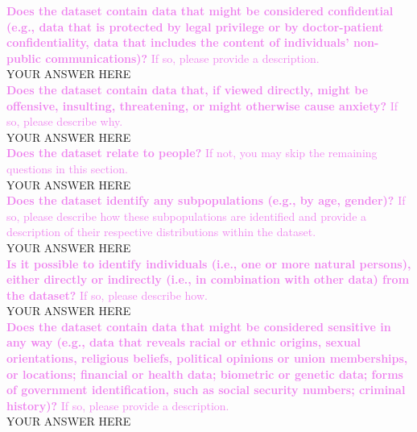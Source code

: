\documentclass[letterpaper, 10 pt, conference]{ieeeconf}
\newcommand{\sectioncolor}{violet}
\begin{document}
    \textcolor{\sectioncolor}{\textbf{
    Does the dataset contain data that might be considered confidential (e.g.,
    data that is protected by legal privilege or by doctor-patient
    confidentiality, data that includes the content of individuals’ non-public
    communications)?
    }
    If so, please provide a description.
    } \\
    YOUR ANSWER HERE \\
    
    \textcolor{\sectioncolor}{\textbf{
    Does the dataset contain data that, if viewed directly, might be offensive,
    insulting, threatening, or might otherwise cause anxiety?
    }
    If so, please describe why.
    } \\
    YOUR ANSWER HERE \\
    
    \textcolor{\sectioncolor}{\textbf{
    Does the dataset relate to people?
    }
    If not, you may skip the remaining questions in this section.
    } \\
    YOUR ANSWER HERE \\
    
    \textcolor{\sectioncolor}{\textbf{
    Does the dataset identify any subpopulations (e.g., by age, gender)?
    }
    If so, please describe how these subpopulations are identified and
    provide a description of their respective distributions within the dataset.
    } \\
    YOUR ANSWER HERE \\
    
    \textcolor{\sectioncolor}{\textbf{
    Is it possible to identify individuals (i.e., one or more natural persons),
    either directly or indirectly (i.e., in combination with other data) from
    the dataset?
    }
    If so, please describe how.
    } \\
    YOUR ANSWER HERE \\
    
    \textcolor{\sectioncolor}{\textbf{
    Does the dataset contain data that might be considered sensitive in any way
    (e.g., data that reveals racial or ethnic origins, sexual orientations,
    religious beliefs, political opinions or union memberships, or locations;
    financial or health data; biometric or genetic data; forms of government
    identification, such as social security numbers; criminal history)?
    }
    If so, please provide a description.
    } \\
    YOUR ANSWER HERE \\
    
\end{document}

